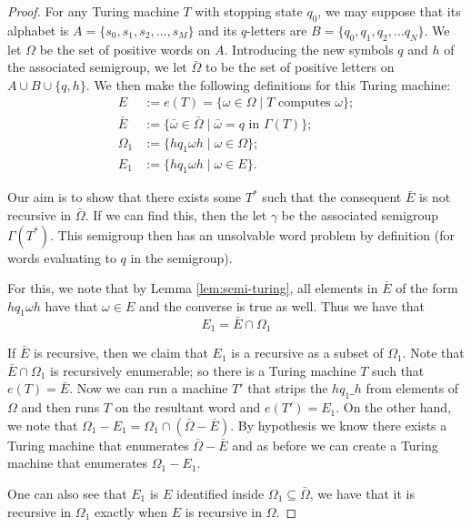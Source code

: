 \begin{proof}
  For any Turing machine $T$ with stopping state $q_0$, we may suppose that its alphabet is $A = \{s_0,s_1,s_2, \dots, s_M \}$ and its $q$-letters are $B = \{q_0,q_1,q_2, \dots q_N\}$. We let $\Omega$ be the set of positive words on $A$. Introducing the new symbols $q$ and $h$ of the associated semigroup, we let $\bar{\Omega}$ to be the set of positive letters on $A \cup B \cup \{ q,h \}$. We then make the following definitions for this Turing machine:
  \begin{align*}
    E &:= e(T) = \{\omega \in \Omega \mid T \text{ computes } \omega\}; \\
    \bar{E} &:= \{\bar{\omega} \in \bar{\Omega} \mid  \bar{\omega} = q \text{ in } \Gamma(T) \}; \\
    \Omega_1 &:= \{hq_1\omega h \mid \omega \in \Omega\}; \\
    E_1 &:= \{hq_1\omega h \mid \omega \in E \}.
  \end{align*}

  Our aim is to show that there exists some $T^*$ such that the consequent $\bar{E}$ is not recursive in $\bar{\Omega}$. If we can find this, then the let $\gamma$ be the associated semigroup $\Gamma(T^*)$. This semigroup then has an unsolvable word problem by definition (for words evaluating to $q$ in the semigroup).

  For this, we note that by Lemma \ref{lem:semi-turing}, all elements in $\bar{E}$ of the form $hq_1\omega h$ have that $\omega \in E$ and the converse is true as well. Thus we have that
  \begin{equation*}
    E_1 = \bar{E} \cap \Omega_1
  \end{equation*}

  If $\bar{E}$ is recursive, then we claim that $E_1$ is a recursive as a subset of $\Omega_1$. Note that $\bar{E} \cap \Omega_1$ is recursively enumerable; so there is a Turing machine $T$ such that $e(T) = \bar{E}$. Now we can run a machine $T'$ that strips the $hq_1 \_ h$ from elements of $\Omega$ and then runs $T$ on the resultant word and $e(T') = E_1$. On the other hand, we note that $\Omega_1 - E_1 = \Omega_1 \cap (\bar{\Omega} - \bar{E})$. By hypothesis we know there exists a Turing machine that enumerates $\bar{\Omega} - \bar{E}$ and as before we can create a Turing machine that enumerates $\Omega_1 - E_1$.
  
  One can also see that $E_1$ is $E$ identified inside $\Omega_1 \subseteq \bar{\Omega}$, we have that it is recursive in $\Omega_1$ exactly when $E$ is recursive in $\Omega$.


\end{proof}
